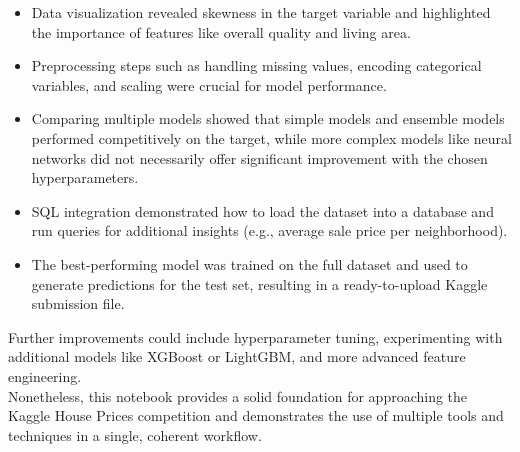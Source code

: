 \documentclass[
]{article}
\newenvironment{Shaded}{\begin{snugshade}}{\end{snugshade}}
\providecommand{\tightlist}{%
  \setlength{\itemsep}{0pt}\setlength{\parskip}{0pt}}
\begin{document}
\begin{itemize}
\tightlist
\item
  Data visualization revealed skewness in the target variable and
  highlighted the importance of features like overall quality and living
  area.
\item
  Preprocessing steps such as handling missing values, encoding
  categorical variables, and scaling were crucial for model performance.
\item
  Comparing multiple models showed that simple models and ensemble
  models performed competitively on the target, while more complex
  models like neural networks did not necessarily offer significant
  improvement with the chosen hyperparameters.
\item
  SQL integration demonstrated how to load the dataset into a database
  and run queries for additional insights (e.g., average sale price per
  neighborhood).
\item
  The best-performing model was trained on the full dataset and used to
  generate predictions for the test set, resulting in a ready-to-upload
  Kaggle submission file.
\end{itemize}

Further improvements could include hyperparameter tuning, experimenting
with additional models like XGBoost or LightGBM, and more advanced
feature engineering.\\
Nonetheless, this notebook provides a solid foundation for approaching
the Kaggle House Prices competition and demonstrates the use of multiple
tools and techniques in a single, coherent workflow.

\begin{Shaded}
\begin{Highlighting}[]

\end{Highlighting}
\end{Shaded}
\end{document}
